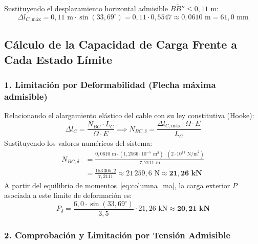 Sustituyendo el desplazamiento horizontal admisible $\overline{BB''} \leq 0{,}11\text{ m}$:
\begin{equation}
    \Delta l_{C,\text{máx}} = 0{,}11\text{ m} \cdot \sin(33{,}69^\circ) = 0{,}11 \cdot 0{,}5547 \approx 0{,}0610\text{ m} = 61{,}0\text{ mm}
\end{equation}

\subsection{Cálculo de la Capacidad de Carga Frente a Cada Estado Límite}

\subsubsection{1. Limitación por Deformabilidad (Flecha máxima admisible)}

Relacionando el alargamiento elástico del cable con su ley constitutiva (Hooke):
\begin{equation}
    \Delta l_C = \frac{N_{BC} \cdot L_C}{\Omega \cdot E} \implies N_{BC,\delta} = \frac{\Delta l_{C,\text{máx}} \cdot \Omega \cdot E}{L_C}
\end{equation}
Sustituyendo los valores numéricos del sistema:
\begin{align}
    N_{BC,\delta} &= \frac{0{,}0610\text{ m} \cdot \left(1{,}2566 \cdot 10^{-5}\text{ m}^2\right) \cdot \left(2 \cdot 10^{11}\text{ N/m}^2\right)}{7{,}2111\text{ m}} \nonumber \\
    &= \frac{153\,305{,}2}{7{,}2111} \approx 21\,259{,}6\text{ N} \approx \mathbf{21{,}26\text{ kN}}
\end{align}
A partir del equilibrio de momentos~\eqref{eq:columna_ma}, la carga exterior $P$ asociada a este límite de deformación es:
\begin{equation}
    P_{\delta} = \frac{6{,}0 \cdot \sin(33{,}69^\circ)}{3{,}5} \cdot 21{,}26\text{ kN} \approx \mathbf{20{,}21\text{ kN}}
\end{equation}

\subsubsection{2. Comprobación y Limitación por Tensión Admisible}

